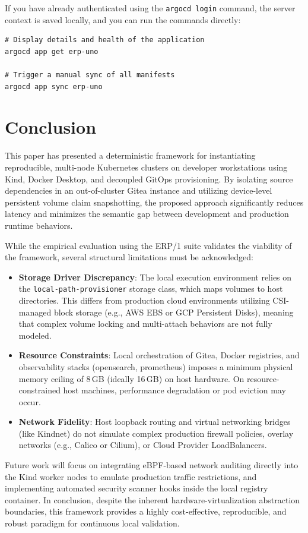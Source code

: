 \documentclass{article}
\begin{document}
If you have already authenticated using the \texttt{argocd login} command, the server context is saved locally, and you can run the commands directly:
\begin{verbatim}
# Display details and health of the application
argocd app get erp-uno

# Trigger a manual sync of all manifests
argocd app sync erp-uno
\end{verbatim}

\newpage
\section{Conclusion}

This paper has presented a deterministic framework for instantiating reproducible,
multi-node Kubernetes clusters on developer workstations using Kind, Docker Desktop,
and decoupled GitOps provisioning. By isolating source dependencies in an out-of-cluster
Gitea instance and utilizing device-level persistent volume claim snapshotting,
the proposed approach significantly reduces latency and minimizes the semantic
gap between development and production runtime behaviors.

While the empirical evaluation using the ERP/1 suite validates the viability of
the framework, several structural limitations must be acknowledged:

\begin{itemize}
    \item \textbf{Storage Driver Discrepancy}: The local execution environment relies
          on the \texttt{local-path-provisioner} storage class, which maps volumes to
          host directories. This differs from production cloud environments utilizing
          CSI-managed block storage (e.g., AWS EBS or GCP Persistent Disks), meaning
          that complex volume locking and multi-attach behaviors are not fully modeled.
    \item \textbf{Resource Constraints}: Local orchestration of Gitea, Docker registries,
          and observability stacks (opensearch, prometheus) imposes a minimum physical
          memory ceiling of 8\,GB (ideally 16\,GB) on host hardware. On resource-constrained
          host machines, performance degradation or pod eviction may occur.
    \item \textbf{Network Fidelity}: Host loopback routing and virtual networking
          bridges (like Kindnet) do not simulate complex production firewall policies,
          overlay networks (e.g., Calico or Cilium), or Cloud Provider LoadBalancers.
\end{itemize}

Future work will focus on integrating eBPF-based network auditing directly into the
Kind worker nodes to emulate production traffic restrictions, and implementing automated
security scanner hooks inside the local registry container. In conclusion, despite the
inherent hardware-virtualization abstraction boundaries, this framework provides a
highly cost-effective, reproducible, and robust paradigm for continuous local validation.
\end{document}
